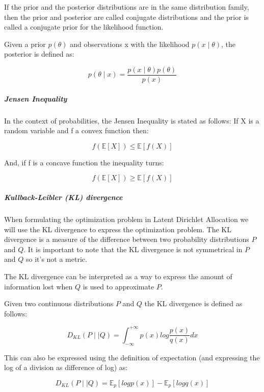 \documentclass[12pt]{report}
\begin{document}
If the prior and the posterior distributions are in the same distribution
family, then the prior and posterior are called conjugate distributions and the
prior is called a conjugate prior for the likelihood function.

Given a prior $p(\theta)$ and observations x with the likelihood 
$p(x \mid \theta)$, the posterior is defined as:

\begin{equation}
p(\theta \mid x) = \frac{p(x \mid \theta) p(\theta)}{p(x)}
\end{equation}


\subparagraph{Jensen Inequality}

In the context of probabilities, the Jensen Inequality is stated as follows: 
If X is a random variable and f a convex function then:

\begin{equation}
f(\mathbb{E}[X]) \leq \mathbb{E}[f(X)]
\end{equation}

And, if f is a concave function the inequality turns:

\begin{equation}
f(\mathbb{E}[X]) \geq \mathbb{E}[f(X)]
\end{equation}


\subparagraph{Kullback-Leibler (KL) divergence}

When formulating the optimization problem in Latent Dirichlet Allocation we 
will use the KL divergence to express the optimization problem. The KL divergence 
is a measure of the difference between two probability distributions $P$ and $Q$. 
It is important to note
that the KL divergence is not symmetrical in $P$ and $Q$ so it’s not a metric.

The KL divergence can be interpreted as a way to express the amount of 
information lost when $Q$ is used to approximate $P$.

Given two continuous distributions $P$ and $Q$ the KL divergence is defined as follows:

\begin{equation}
D_{KL}(P \mid \mid Q) = \int_{-\infty}^{+\infty} p(x) log\frac{p(x)}{q(x)}dx
\end{equation}

This can also be expressed using the definition of expectation (and expressing the 
log of a division as difference of log) as:

\begin{equation}
D_{KL}(P \mid \mid Q) = \mathbb{E}_{p}[log p(x)] - \mathbb{E}_{p}[log q(x)]
\end{equation}
\end{document}
